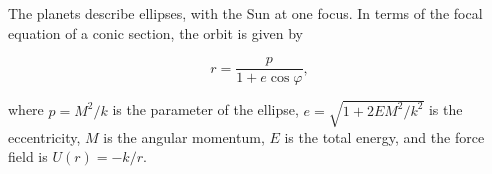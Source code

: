 The planets describe ellipses, with the Sun at one focus. In terms of the focal equation of a conic section, the orbit is given by

$$r = \frac{p}{1 + e \cos \varphi},$$

where $p = M^2/k$ is the parameter of the ellipse, $e = \sqrt{1 + 2EM^2/k^2}$ is the eccentricity, $M$ is the angular momentum, $E$ is the total energy, and the force field is $U(r) = -k/r$.
